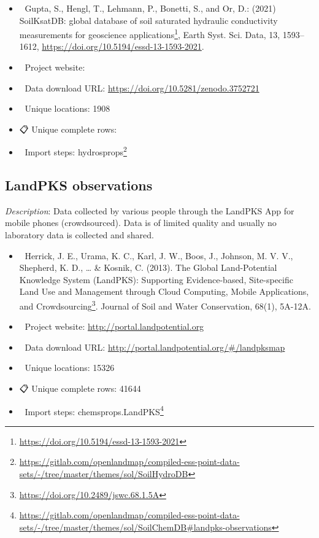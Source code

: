 \documentclass[
  graybox,natbib,nospthms]{svmono}
\providecommand{\tightlist}{%
  \setlength{\itemsep}{0pt}\setlength{\parskip}{0pt}}
\providecommand{\tightlist}{\setlength{\itemsep}{0pt}\setlength{\parskip}{0pt}}
\renewcommand{\href}[2]{#2 (\url{#1})}
\renewcommand{\href}[2]{#2\footnote{\url{#1}}}
\begin{document}
\begin{itemize}
\tightlist
\item
  📕 Gupta, S., Hengl, T., Lehmann, P., Bonetti, S., and Or, D.: (2021) \href{https://doi.org/10.5194/essd-13-1593-2021}{SoilKsatDB: global database of soil saturated hydraulic conductivity measurements for geoscience applications}, Earth Syst. Sci. Data, 13, 1593--1612, \url{https://doi.org/10.5194/essd-13-1593-2021}.\\
\item
  🔗 Project website:\\
\item
  📂 Data download URL: \url{https://doi.org/10.5281/zenodo.3752721}\\
\item
  📍 Unique locations: 1908\\
\item
  📋 Unique complete rows:\\
\item
  📝 Import steps: \href{https://gitlab.com/openlandmap/compiled-ess-point-data-sets/-/tree/master/themes/sol/SoilHydroDB}{hydrosprops}
\end{itemize}

\hypertarget{landpks-observations}{%
\subsection{LandPKS observations}\label{landpks-observations}}

\emph{Description}: Data collected by various people through the LandPKS App for mobile
phones (crowdsourced). Data is of limited quality and usually no laboratory data is collected and shared.

\begin{itemize}
\tightlist
\item
  📕 Herrick, J. E., Urama, K. C., Karl, J. W., Boos, J., Johnson, M. V. V., Shepherd, K. D., \ldots{} \& Kosnik, C. (2013). \href{https://doi.org/10.2489/jswc.68.1.5A}{The Global Land-Potential Knowledge System (LandPKS): Supporting Evidence-based, Site-specific Land Use and Management through Cloud Computing, Mobile Applications, and Crowdsourcing}. Journal of Soil and Water Conservation, 68(1), 5A-12A.\\
\item
  🔗 Project website: \url{http://portal.landpotential.org}\\
\item
  📂 Data download URL: \url{http://portal.landpotential.org/\#/landpksmap}\\
\item
  📍 Unique locations: 15326\\
\item
  📋 Unique complete rows: 41644\\
\item
  📝 Import steps: \href{https://gitlab.com/openlandmap/compiled-ess-point-data-sets/-/tree/master/themes/sol/SoilChemDB\#landpks-observations}{chemsprops.LandPKS}
\end{itemize}
\end{document}
